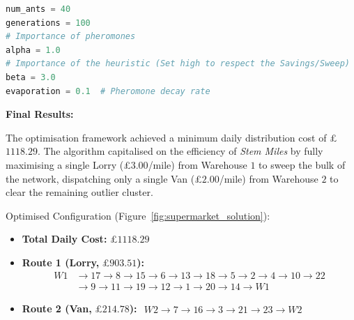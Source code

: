 \documentclass[12pt, a4paper]{article}
\begin{document}
\vspace{0.25cm}

\noindent\begin{minipage}{1\linewidth}
    \begin{lstlisting}[language=Python, caption=The optimal hyperparameters to prioritise heuristics and prevent incremental stagnation within the swarm., label=lst:hyperparameter_2]
num_ants = 40
generations = 100
# Importance of pheromones
alpha = 1.0
# Importance of the heuristic (Set high to respect the Savings/Sweep)
beta = 3.0
evaporation = 0.1  # Pheromone decay rate
    \end{lstlisting}
\end{minipage}

\textbf{Final Results:}

\vspace{0.25cm}

The optimisation framework achieved a minimum daily distribution cost of \pounds$1118.29$. The algorithm capitalised on the efficiency of \textit{Stem Miles} by fully maximising a single Lorry (\pounds$3.00$/mile) from Warehouse $1$ to sweep the bulk of the network, dispatching only a single Van (\pounds$2.00$/mile) from Warehouse $2$ to clear the remaining outlier cluster.

\vspace{0.5cm}

\hspace{-1.5em}Optimised Configuration (Figure~\ref{fig:supermarket_solution}):

\begin{itemize}
    \item \textbf{Total Daily Cost:} \pounds$1118.29$

    \item \textbf{Route 1 (Lorry,} \pounds$903.51$\textbf{):}
    $$\begin{aligned}
        W1 &\rightarrow 17 \rightarrow 8 \rightarrow 15 \rightarrow 6 \rightarrow 13 \rightarrow 18 \rightarrow 5 \rightarrow 2 \rightarrow 4 \rightarrow 10 \rightarrow 22 \\
        &\rightarrow 9 \rightarrow 11 \rightarrow 19 \rightarrow 12 \rightarrow 1 \rightarrow 20 \rightarrow 14 \rightarrow W1
    \end{aligned}$$

    \item \textbf{Route 2 (Van,} \pounds$214.78$\textbf{):}
    $\begin{aligned}
        W2 \rightarrow 7 \rightarrow 16 \rightarrow 3 \rightarrow 21 \rightarrow 23 \rightarrow W2
    \end{aligned}$
\end{itemize}
\end{document}

